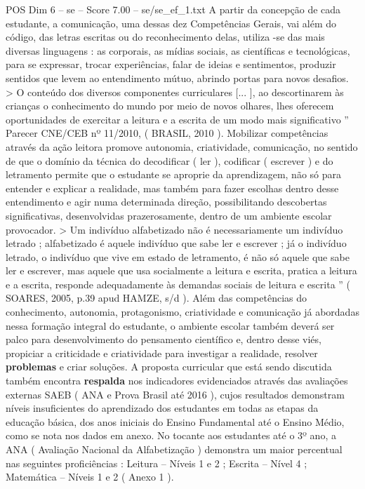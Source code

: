 \begin{textsample}{POS Dim 6 – se – Score 7.00 – se/se\_ef\_1.txt}
A partir da concepção de cada estudante, a comunicação, uma dessas dez Competências Gerais, vai além do código, das letras escritas ou do reconhecimento delas, utiliza -se das mais diversas linguagens : as corporais, as mídias sociais, as científicas e tecnológicas, para se expressar, trocar experiências, falar de ideias e sentimentos, produzir sentidos que levem ao entendimento mútuo, abrindo portas para novos desafios. > O conteúdo dos diversos componentes curriculares [... ], ao descortinarem às crianças o conhecimento do mundo por meio de novos olhares, lhes oferecem oportunidades de exercitar a leitura e a escrita de um modo mais significativo ” Parecer CNE/CEB nº 11/2010, ( BRASIL, 2010 ).
Mobilizar competências através da ação leitora promove autonomia, criatividade, comunicação, no sentido de que o domínio da técnica do decodificar ( ler ), codificar ( escrever ) e do letramento permite que o estudante se aproprie da aprendizagem, não só para entender e explicar a realidade, mas também para fazer escolhas dentro desse entendimento e agir numa determinada direção, possibilitando descobertas significativas, desenvolvidas prazerosamente, dentro de um ambiente escolar provocador. > Um indivíduo alfabetizado não é necessariamente um indivíduo letrado ; alfabetizado é aquele indivíduo que sabe ler e escrever ; já o indivíduo letrado, o indivíduo que vive em estado de letramento, é não só aquele que sabe ler e escrever, mas aquele que usa socialmente a leitura e escrita, pratica a leitura e a escrita, responde adequadamente às demandas sociais de leitura e escrita ” ( SOARES, 2005, p.39 apud HAMZE, s/d ).
Além das competências do conhecimento, autonomia, protagonismo, criatividade e comunicação já abordadas nessa formação integral do estudante, o ambiente escolar também deverá ser palco para desenvolvimento do pensamento científico e, dentro desse viés, propiciar a criticidade e criatividade para investigar a realidade, resolver \textbf{problemas} e criar soluções.
A proposta curricular que está sendo discutida também encontra \textbf{respalda} nos indicadores evidenciados através das avaliações externas SAEB ( ANA e Prova Brasil até 2016 ), cujos resultados demonstram níveis insuficientes do aprendizado dos estudantes em todas as etapas da educação básica, dos anos iniciais do Ensino Fundamental até o Ensino Médio, como se nota nos dados em anexo.
No tocante aos estudantes até o 3º ano, a ANA ( Avaliação Nacional da Alfabetização ) demonstra um maior percentual nas seguintes proficiências : Leitura – Níveis 1 e 2 ; Escrita – Nível 4 ; Matemática – Níveis 1 e 2 ( Anexo 1 ).

\end{textsample}
